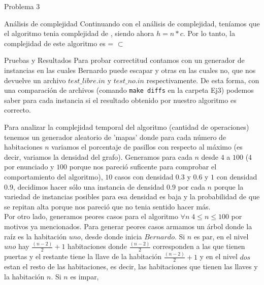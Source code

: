 \begin{section}{Problema 3}
\begin{subsection}{Análisis de complejidad}
		Continuando con el análisis de complejidad, teníamos que el algoritmo tenia complejidad de , siendo ahora $h=n*c$. Por lo tanto, la complejidad de este algoritmo es  =  $\subset$ \\
	\end{subsection}


	\begin{subsection}{Pruebas y Resultados}
		Para probar correctitud contamos con un generador de instancias en las cuales Bernardo puede escapar y otras en las cuales no, que nos devuelve un archivo $test\_libre.in$ y $test\_no.in$ respectivamente. De esta forma, con una comparación de archivos (comando \texttt{make diffs} en la carpeta Ej3) podemos saber para cada instancia si el resultado obtenido por nuestro algoritmo es correcto.

		Para analizar la complejidad temporal del algoritmo (cantidad de operaciones) tenemos un generador aleatorio de 'mapas' donde para cada número de habitaciones $n$ variamos el porcentaje de pasillos con respecto al máximo (es decir, variamos la densidad del grafo). Generamos para cada $n$ desde $4$ a $100$ ($4$ por enunciado y $100$ porque nos pareció suficente para comprobar el comportamiento del algoritmo), $10$ casos con densidad $0.3$ y $0.6$ y $1$ con densidad $0.9$, decidimos hacer sólo una instancia de densidad $0.9$ por cada $n$ porque la variedad de instancias posibles para esa densidad es baja y la probabilidad de que se repitan alta porque nos pareció que no tenia sentido hacer más.\\
		Por otro lado, generamos peores casos para el algoritmo $\forall n\; 4 \leq n \leq 100$ por motivos ya mencionados. Para generar peores casos armamos un árbol donde la raíz es la habitación  $uno$, desde donde inicia $Bernardo$. Si $n$ es par, en el nivel $uno$  hay $\frac{(n-2)}{2} + 1$ habitaciones donde $\frac{(n-2)}{2}$ corresponden a las que tienen puertas y el restante tiene la llave de la habitación $\frac{(n-2)}{2} + 1$ y en el nivel $dos$ estan el resto de las habitaciones, es decir, las habitaciones que tienen las llaves y la habitación $n$. Si $n$ es impar, 


		
	\end{subsection}

\end{section}

